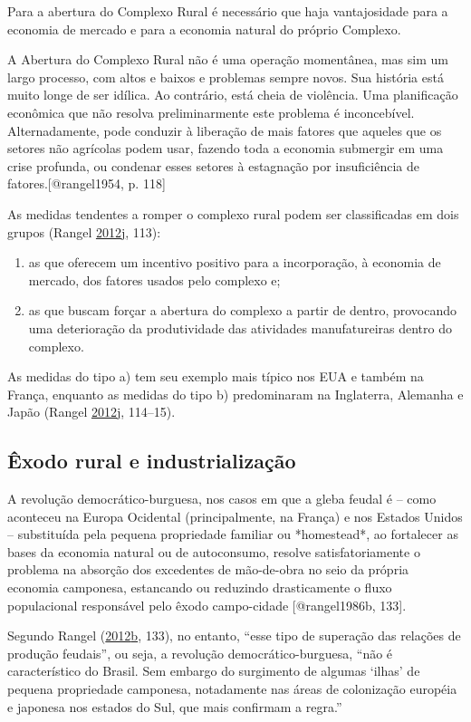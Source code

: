 \documentclass[
	12pt,				%
	oneside,			%
	a4paper,			%
	chapter=TITLE,		%
	section=TITLE,		%
	english,			%
	brazil				%
	]{abntex2}
\begin{document}
Para a abertura do Complexo Rural é necessário que haja vantajosidade para a
economia de mercado e para a economia natural do próprio Complexo.
\begin{citacao} 
A Abertura do Complexo Rural não é uma operação momentânea, mas sim um largo
processo, com altos e baixos e problemas sempre novos. Sua história está muito
longe de ser idílica. Ao contrário, está cheia de violência. Uma planificação
econômica que não resolva preliminarmente este problema é inconcebível.
Alternadamente, pode conduzir à liberação de mais fatores que aqueles que os
setores não agrícolas podem usar, fazendo toda a economia submergir em uma crise
profunda, ou condenar esses setores à estagnação por insuficiência de
fatores.[@rangel1954, p. 118]
\end{citacao}
As medidas tendentes a romper o complexo rural podem ser classificadas em dois
grupos (Rangel \protect\hyperlink{ref-rangel1954}{2012}\protect\hyperlink{ref-rangel1954}{j}, 113):
\begin{enumerate}
\def\labelenumi{\alph{enumi}.}
\item
  as que oferecem um incentivo positivo para a incorporação, à economia de
  mercado, dos fatores usados pelo complexo e;
\item
  as que buscam forçar a abertura do complexo a partir de dentro, provocando
  uma deterioração da produtividade das atividades manufatureiras dentro do
  complexo.
\end{enumerate}
As medidas do tipo a) tem seu exemplo mais típico nos EUA e também na França,
enquanto as medidas do tipo b) predominaram na Inglaterra, Alemanha e Japão
(Rangel \protect\hyperlink{ref-rangel1954}{2012}\protect\hyperlink{ref-rangel1954}{j}, 114--15).

\hypertarget{uxeaxodo-rural-e-industrializauxe7uxe3o}{%
\subsection{Êxodo rural e industrialização}\label{uxeaxodo-rural-e-industrializauxe7uxe3o}}
\begin{citacao}
A revolução democrático-burguesa, nos casos em que a gleba feudal é -- como
aconteceu na Europa Ocidental (principalmente, na França) e nos Estados Unidos
-- substituída pela pequena propriedade familiar ou *homestead*, ao fortalecer
as bases da economia natural ou de autoconsumo, resolve satisfatoriamente o
problema na absorção dos excedentes de mão-de-obra no seio da própria economia
camponesa, estancando ou reduzindo drasticamente o fluxo populacional
responsável pelo êxodo campo-cidade [@rangel1986b, 133]. 
\end{citacao}
Segundo Rangel (\protect\hyperlink{ref-rangel1986b}{2012}\protect\hyperlink{ref-rangel1986b}{b}, 133), no entanto, ``esse tipo de superação das
relações de produção feudais'', ou seja, a revolução democrático-burguesa, ``não é
característico do Brasil. Sem embargo do surgimento de algumas `ilhas' de
pequena propriedade camponesa, notadamente nas áreas de colonização européia e
japonesa nos estados do Sul, que mais confirmam a regra.''
\end{document}
